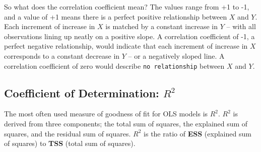\documentclass[11pt,openany]{book}\usepackage[]{graphicx}\usepackage[]{color}
\begin{document}
So what does the correlation coefficient mean? The values range from +1 to -1, and a value of +1 means  there is a perfect positive relationship between $X$ and $Y$. Each increment of increase in $X$ is matched by a constant increase in $Y$ -- with all observations lining up neatly on a positive slope. A correlation  coefficient of -1, a perfect negative relationship, would indicate that each increment of increase in $X$ corresponds to a constant decrease in $Y$ -- or a negatively sloped line. A correlation coefficient of zero would describe \texttt{no relationship} between $X$ and $Y$.

\subsection{Coefficient of Determination: $R^{2}$} 

The most often used measure of goodness of fit for OLS models is $R^{2}$.  $R^{2}$ is derived from three components; the total sum of squares, the explained sum of squares, and the residual sum of squares. $R^{2}$ is the ratio of \textbf{ESS} (explained sum of squares) to \textbf{TSS} (total sum of squares).
 
\begin{grbox}
\end{grbox} 
\end{document}
